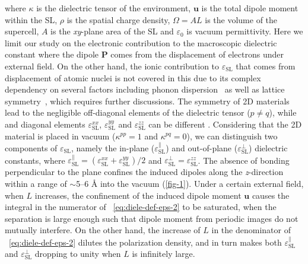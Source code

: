 where $\kappa$ is the dielectric tensor of the environment,
$\symbf{u}$ is the total dipole moment within the SL, $\rho$ is the
spatial charge density, $\Omega=AL$ is the volume of the supercell,
$A$ is the \textit{xy}-plane area of the SL and $\varepsilon_{0}$ is
vacuum permittivity. Here we limit our study on the electronic
contribution to the macroscopic dielectric constant where the dipole
$\symbf{P}$ comes from the displacement of electrons under external
field.  On the other hand, the ionic contribution to
$\varepsilon_{\mathrm{SL}}$ that comes from displacement of atomic
nuclei is not covered in this due to its complex dependency on several
factors including phonon dispersion~\autocite{Sohier_2017_phonon} as well
as lattice symmetry~\autocite{Laturia_2018_2D_eps}, which requires
further discussions.  The symmetry of 2D materials lead to the
negligible off-diagonal elements of the dielectric tensor
($p \neq q$), while and diagonal elements
$\varepsilon_{\mathrm{SL}}^{xx}$, $\varepsilon_{\mathrm{SL}}^{yy}$ and
$\varepsilon_{\mathrm{SL}}^{zz}$ can be different
\autocite{Sohier_2016_2D_eps}.  Considering that the 2D material is placed
in vacuum ($\kappa^{pp} = 1$ and $\kappa^{pq} = 0$), we can
distinguish two components of $\varepsilon_{\mathrm{SL}}$, namely the
in-plane ($\varepsilon_{\mathrm{SL}}^{\parallel}$) and out-of-plane
($\varepsilon_{\mathrm{SL}}^{\perp}$) dielectric constants, where
$\varepsilon_{\mathrm{SL}}^{\parallel} =
(\varepsilon_{\mathrm{SL}}^{xx} + \varepsilon_{\mathrm{SL}}^{yy})/2$
and
$\varepsilon_{\mathrm{SL}}^{\perp} = \varepsilon_{\mathrm{SL}}^{zz}$.
The absence of bonding perpendicular to the plane confines the induced
dipoles along the \textit{z}-direction within a range of $\sim{}$5--6
\AA{} into the vacuum (\autoref{fig-1}).
%
%
Under a certain external field, when $L$ increases, the confinement of
the induced dipole moment $\symbf{u}$ causes the integral in the
numerator of ~\autoref{eq:diele-def-eps-2} to be saturated, when the
separation is large enough such that dipole moment from periodic
images do not mutually interfere. On the other hand, the increase of
$L$ in the denominator of ~\autoref{eq:diele-def-eps-2} dilutes the polarization density, and in turn makes both
$\varepsilon^{\parallel}_{\mathrm{SL}}$ and
$\varepsilon^{\perp}_{\mathrm{SL}}$ dropping to
unity when $L$ is infinitely large.
%
